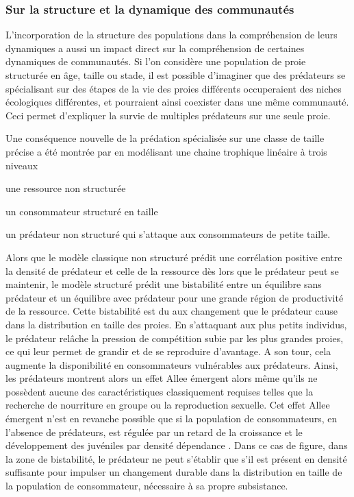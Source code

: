 \subsubsection{Sur la structure et la dynamique des communautés}

L'incorporation de la structure des populations dans la compréhension de leurs 
dynamiques a aussi un impact direct sur la compréhension de certaines dynamiques
de communautés. Si l'on considère une population de proie structurée en âge,
taille ou stade, il est possible d'imaginer que des prédateurs se
spécialisant sur des étapes de la vie des proies différents occuperaient des
niches écologiques différentes, et pourraient ainsi coexister dans une même
communauté. Ceci permet d'expliquer la survie de multiples prédateurs sur une
seule proie. 

Une conséquence nouvelle de la prédation spécialisée sur une classe de taille
précise a été montrée par \textcite{de-roos2002a} en modélisant une chaine
trophique linéaire à trois niveaux \begin{enumerate*}[label=(\roman*), before=\unskip{ : }, itemjoin={{ ; }},
itemjoin*={{ ; et }}]\item une ressource non structurée \item un consommateur
structuré en taille \item un prédateur non structuré qui
s'attaque aux consommateurs de petite taille.\end{enumerate*} Alors que le
modèle classique non structuré prédit une corrélation positive entre la densité
de prédateur et celle de la ressource dès lors que le prédateur peut se
maintenir, le modèle structuré prédit une bistabilité entre un équilibre sans
prédateur et un équilibre avec prédateur pour une grande région de productivité
de la ressource. Cette bistabilité est du aux changement que le prédateur cause
dans la distribution en taille des proies. En s'attaquant aux plus petits
individus, le prédateur relâche la pression de compétition subie par les plus
grandes proies, ce qui leur permet de grandir et de se reproduire d'avantage. A
son tour, cela augmente la disponibilité en consommateurs vulnérables aux
prédateurs. Ainsi, les prédateurs montrent alors un effet Allee émergent alors
même qu'ils ne possèdent aucune des caractéristiques classiquement requises
telles que la recherche de nourriture en groupe ou la reproduction sexuelle. Cet
effet Allee émergent n'est en revanche possible que si la population de
consommateurs, en l'absence de prédateurs, est régulée par un retard de la
croissance et le développement des juvéniles par densité dépendance
\autocite{de-roos2003a}. Dans ce cas de figure, dans la zone de bistabilité, le
prédateur ne peut s'établir que s'il est présent en densité suffisante pour
impulser un changement durable dans la distribution en taille de la population
de consommateur, nécessaire à sa propre subsistance. 

